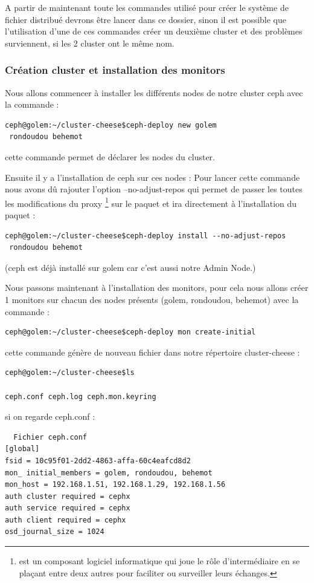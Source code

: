 \documentclass[12pt]{article}
\begin{document}
A partir de maintenant toute les commandes utilisé pour créer le système de fichier distribué devrons être lancer dans ce dossier, sinon il est possible que l'utilisation d'une de ces commandes créer un deuxième cluster et des problèmes surviennent, si les 2 cluster ont le même nom.

\subsubsection{Création cluster et installation des monitors}

Nous allons commencer à installer les différents nodes de notre cluster ceph avec la commande :
\begin{verbatim}
ceph@golem:~/cluster-cheese$ceph-deploy new golem
 rondoudou behemot
\end{verbatim}

cette commande permet de déclarer les nodes du cluster.

Ensuite il y a l'installation de ceph sur ces nodes :
Pour lancer cette commande nous avons dû rajouter l'option --no-adjust-repos qui permet de passer les toutes les modifications du proxy \footnote{est un composant logiciel informatique qui joue le rôle d'intermédiaire en se plaçant entre deux autres pour faciliter ou surveiller leurs échanges.} sur le paquet et ira directement à l'installation du paquet :
\begin{verbatim}
ceph@golem:~/cluster-cheese$ceph-deploy install --no-adjust-repos
 rondoudou behemot 
\end{verbatim}

(ceph est déjà installé sur golem car c'est aussi notre Admin Node.)

Nous passons maintenant à l'installation des monitors, pour cela nous allons créer 1 monitors sur chacun des nodes présents (golem, rondoudou, behemot) avec la commande :
\begin{verbatim}
ceph@golem:~/cluster-cheese$ceph-deploy mon create-initial
\end{verbatim}

cette commande génère de nouveau fichier dans notre répertoire cluster-cheese :
\begin{verbatim}
ceph@golem:~/cluster-cheese$ls

ceph.conf ceph.log ceph.mon.keyring
\end{verbatim}

si on regarde ceph.conf :
\begin{verbatim}
  Fichier ceph.conf
[global]
fsid = 10c95f01-2dd2-4863-affa-60c4eafcd8d2
mon_ initial_members = golem, rondoudou, behemot
mon_host = 192.168.1.51, 192.168.1.29, 192.168.1.56
auth cluster required = cephx
auth service required = cephx
auth client required = cephx
osd_journal_size = 1024
\end{verbatim}
\end{document}
